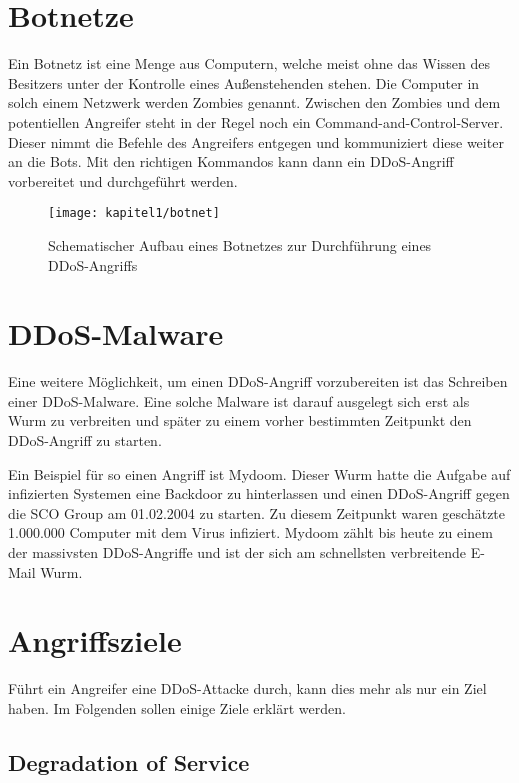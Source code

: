 \section{Botnetze}
\label{sec:k1botnetze}
Ein Botnetz ist eine Menge aus Computern, welche meist ohne das Wissen des Besitzers unter der Kontrolle eines Außenstehenden stehen. Die Computer in solch einem Netzwerk werden Zombies genannt. Zwischen den Zombies und dem potentiellen Angreifer steht in der Regel noch ein Command-and-Control-Server. Dieser nimmt die Befehle des Angreifers entgegen und kommuniziert diese weiter an die Bots. Mit den richtigen Kommandos kann dann ein DDoS-Angriff vorbereitet und durchgeführt werden.

\begin{figure}[!hb]
		\centering
		\texttt{[image: kapitel1/botnet]}
		\caption[Schematischer Aufbau bei einem DDoS-Angriff mit einem Botnetz]{Schematischer Aufbau eines Botnetzes zur Durchführung eines DDoS-Angriffs}
		\label{img:botnet}
\end{figure}

\section{DDoS-Malware}
\label{sec:k1malware}
Eine weitere Möglichkeit, um einen DDoS-Angriff vorzubereiten ist das Schreiben einer DDoS-Malware. Eine solche Malware ist darauf ausgelegt sich erst als Wurm zu verbreiten und später zu einem vorher bestimmten Zeitpunkt den DDoS-Angriff zu starten.

Ein Beispiel für so einen Angriff ist Mydoom. Dieser Wurm hatte die Aufgabe auf infizierten Systemen eine Backdoor zu hinterlassen und einen DDoS-Angriff gegen die SCO Group am 01.02.2004 zu starten. Zu diesem Zeitpunkt waren geschätzte 1.000.000 Computer mit dem Virus infiziert. Mydoom zählt bis heute zu einem der massivsten DDoS-Angriffe und ist der sich am schnellsten verbreitende E-Mail Wurm.

\section{Angriffsziele}
\label{chap:kapitel4}

Führt ein Angreifer eine DDoS-Attacke durch, kann dies mehr als nur ein Ziel haben. Im Folgenden sollen einige Ziele erklärt werden.

\subsection{Degradation of Service}

